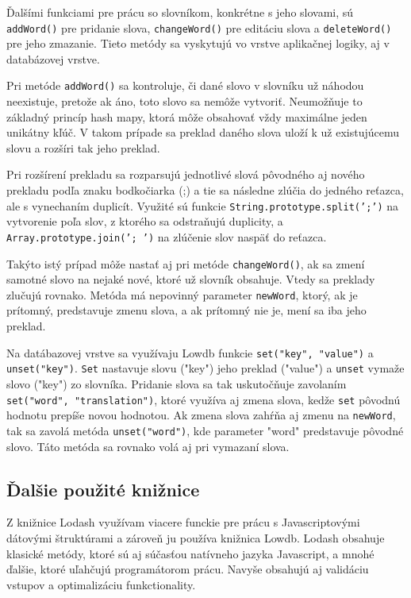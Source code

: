 \documentclass[
  digital, %
  table,   %
  lof,     %
  lot,     %
]{fithesis3}
\begin{document}
Ďalšími funkciami pre prácu so slovníkom, konkrétne s jeho slovami, sú \texttt{addWord()} pre pridanie slova, \texttt{changeWord()} pre editáciu slova a \texttt{deleteWord()} pre jeho zmazanie. Tieto metódy sa vyskytujú vo vrstve aplikačnej logiky, aj v databázovej vrstve.

Pri metóde \texttt{addWord()} sa kontroluje, či dané slovo v slovníku už náhodou neexistuje, pretože ak áno, toto slovo sa nemôže vytvoriť. Neumožňuje to základný princíp hash mapy, ktorá môže obsahovať vždy maximálne jeden unikátny kľúč. V takom prípade sa preklad daného slova uloží k už existujúcemu slovu a rozšíri tak jeho preklad.

Pri rozšírení prekladu sa rozparsujú jednotlivé slová pôvodného aj nového prekladu podľa znaku bodkočiarka (;) a tie sa následne zlúčia do jedného reťazca, ale s vynechaním duplicít. Využité sú funkcie \texttt{String.prototype.split(';')} na vytvorenie poľa slov, z ktorého sa odstraňujú duplicity, a \texttt{Array.prototype.join('; ')} na zlúčenie slov naspäť do reťazca.

Takýto istý prípad môže nastať aj pri metóde \texttt{changeWord()}, ak sa zmení samotné slovo na nejaké nové, ktoré už slovník obsahuje. Vtedy sa preklady zlučujú rovnako. Metóda má nepovinný parameter \texttt{newWord}, ktorý, ak je prítomný, predstavuje zmenu slova, a ak prítomný nie je, mení sa iba jeho preklad.

Na datábazovej vrstve sa využívaju Lowdb funkcie \texttt{set("key", "value")} a \texttt{unset("key")}. \texttt{Set} nastavuje slovu ("key") jeho preklad ("value") a \texttt{unset} vymaže slovo ("key") zo slovníka. Pridanie slova sa tak uskutočňuje zavolaním \texttt{set("word", "translation")}, ktoré využíva aj zmena slova, kedže \texttt{set} pôvodnú hodnotu prepíše novou hodnotou. Ak zmena slova zahŕňa aj zmenu na \texttt{newWord}, tak sa zavolá metóda \texttt{unset("word")}, kde parameter "word" predstavuje pôvodné slovo. Táto metóda sa rovnako volá aj pri vymazaní slova.

\subsection{Ďalšie použité knižnice}
Z knižnice Lodash využívam viacere funckie pre prácu s Javascriptovými dátovými štruktúrami a zároveň ju používa knižnica Lowdb. Lodash obsahuje klasické metódy, ktoré sú aj súčasťou natívneho jazyka Javascript, a mnohé ďalšie, ktoré uľahčujú programátorom prácu. Navyše obsahujú aj validáciu vstupov a optimalizáciu funkctionality.
\end{document}

